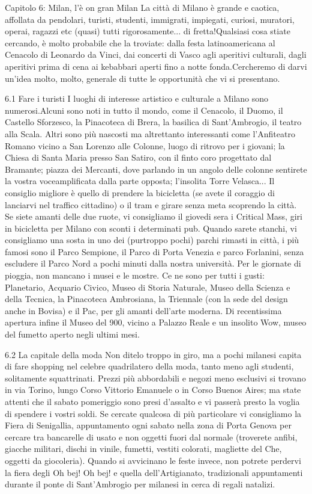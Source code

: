 Capitolo 6: Milan, l’è on gran Milan
La città di Milano è grande e caotica, affollata da pendolari, turisti, studenti, immigrati, impiegati, curiosi, muratori, operai, ragazzi etc (quasi) tutti rigorosamente... di fretta!Qualsiasi cosa stiate cercando, è molto probabile che la troviate: dalla festa latinoamericana al Cenacolo di Leonardo da Vinci, dai concerti di Vasco agli aperitivi culturali, dagli aperitivi prima di cena ai kebabbari aperti fino a notte fonda.Cercheremo di darvi un'idea molto, molto, generale di tutte le opportunità che vi si presentano.

6.1 Fare i turisti
I luoghi di interesse artistico e culturale a Milano sono numerosi.Alcuni sono noti in tutto il mondo, come il Cenacolo, il Duomo, il Castello Sforzesco, la Pinacoteca di Brera, la basilica di Sant'Ambrogio, il teatro alla Scala. Altri sono più nascosti ma altrettanto interessanti come l'Anfiteatro Romano vicino a San Lorenzo alle Colonne, luogo di ritrovo per i giovani; la Chiesa di Santa Maria presso San Satiro, con il finto coro progettato dal Bramante; piazza dei Mercanti, dove parlando in un angolo delle colonne sentirete la vostra voceamplificata dalla parte opposta; l'insolita Torre Velasca...
Il consiglio migliore è quello di prendere la bicicletta (se avete il coraggio di lanciarvi nel traffico cittadino) o il tram e girare senza meta scoprendo la città. Se siete amanti delle due ruote, vi consigliamo il giovedi sera i Critical Mass, giri in bicicletta per Milano con sconti i determinati pub. Quando sarete stanchi, vi consigliamo una sosta in uno dei (purtroppo pochi) parchi rimasti in città, i più famosi sono il Parco Sempione, il Parco di Porta Venezia e parco Forlanini, senza escludere il Parco Nord a pochi minuti dalla nostra università. Per le giornate di pioggia, non mancano i musei e le mostre. Ce ne sono per tutti i gusti: Planetario, Acquario Civico, Museo di Storia Naturale, Museo della Scienza e della Tecnica, la Pinacoteca Ambrosiana, la Triennale (con la sede del design anche in Bovisa) e il Pac, per gli amanti dell'arte moderna. Di recentissima apertura infine il Museo del 900, vicino a Palazzo Reale e un insolito Wow, museo del fumetto aperto negli ultimi mesi.

6.2 La capitale della moda
Non ditelo troppo in giro, ma a pochi milanesi capita di fare shopping nel celebre quadrilatero della moda, tanto meno agli studenti, solitamente squattrinati. Prezzi più abbordabili e negozi meno esclusivi si trovano in via Torino, lungo Corso Vittorio Emanuele o in Corso Buenos Aires; ma state attenti che il sabato pomeriggio sono presi d'assalto e vi passerà presto la voglia di spendere i vostri soldi. Se cercate qualcosa di più particolare vi consigliamo la Fiera di Senigallia, appuntamento ogni sabato nella zona di Porta Genova per cercare tra bancarelle di usato e non oggetti fuori dal normale (troverete anfibi, giacche militari, dischi in vinile, fumetti, vestiti colorati, magliette del Che, oggetti da giocoleria).
Quando si avvicinano le feste invece, non potrete perdervi la fiera degli Oh bej! Oh bej! e quella dell'Artigianato, tradizionali appuntamenti durante il ponte di Sant'Ambrogio per milanesi in cerca di regali natalizi.

